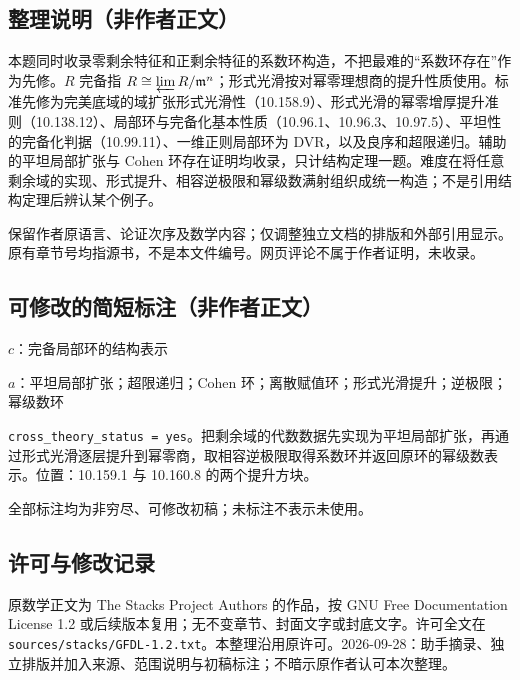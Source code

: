 \documentclass[UTF8,11pt]{ctexart}
\theoremstyle{definition}
\begin{document}
\subsection*{整理说明（非作者正文）}
本题同时收录零剩余特征和正剩余特征的系数环构造，不把最难的“系数环存在”作为先修。$R$ 完备指 $R\cong\varprojlim R/\mathfrak m^n$；形式光滑按对幂零理想商的提升性质使用。标准先修为完美底域的域扩张形式光滑性（10.158.9）、形式光滑的幂零增厚提升准则（10.138.12）、局部环与完备化基本性质（10.96.1、10.96.3、10.97.5）、平坦性的完备化判据（10.99.11）、一维正则局部环为 DVR，以及良序和超限递归。辅助的平坦局部扩张与 Cohen 环存在证明均收录，只计结构定理一题。难度在将任意剩余域的实现、形式提升、相容逆极限和幂级数满射组织成统一构造；不是引用结构定理后辨认某个例子。

保留作者原语言、论证次序及数学内容；仅调整独立文档的排版和外部引用显示。原有章节号均指源书，不是本文件编号。网页评论不属于作者证明，未收录。
\subsection*{可修改的简短标注（非作者正文）}
$c$：完备局部环的结构表示

$a$：平坦局部扩张；超限递归；Cohen 环；离散赋值环；形式光滑提升；逆极限；幂级数环

\texttt{cross\_theory\_status = yes}。把剩余域的代数数据先实现为平坦局部扩张，再通过形式光滑逐层提升到幂零商，取相容逆极限取得系数环并返回原环的幂级数表示。位置：10.159.1 与 10.160.8 的两个提升方块。

全部标注均为非穷尽、可修改初稿；未标注不表示未使用。
\subsection*{许可与修改记录}
原数学正文为 The Stacks Project Authors 的作品，按 GNU Free Documentation License 1.2 或后续版本复用；无不变章节、封面文字或封底文字。许可全文在 \texttt{sources/stacks/GFDL-1.2.txt}。本整理沿用原许可。2026-09-28：助手摘录、独立排版并加入来源、范围说明与初稿标注；不暗示原作者认可本次整理。
\end{document}
